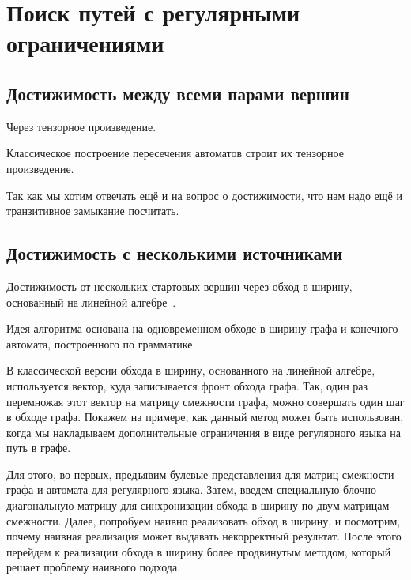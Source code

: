 \setchapterpreamble[u]{\margintoc}
\chapter{Поиск путей с регулярными ограничениями}

\section{Достижимость между всеми парами вершин}

Через тензорное произведение.

Классическое построение пересечения автоматов строит их тензорное произведение.

Так как мы хотим отвечать ещё и на вопрос о достижимости, что нам надо ещё и транзитивное замыкание посчитать.

\section{Достижимость с несколькими источниками}

Достижимость от нескольких стартовых вершин через обход в ширину, основанный на линейной алгебре~.

Идея алгоритма основана на одновременном обходе в ширину графа и конечного автомата, построенного по грамматике.

В классической версии обхода в ширину, основанного на линейной алгебре, используется вектор, куда записывается фронт обхода графа.
Так, один раз перемножая этот вектор на матрицу смежности графа, можно совершать один шаг в обходе графа.
Покажем на примере, как данный метод может быть использован, когда мы накладываем дополнительные ограничения в виде регулярного языка на путь в графе.

Для этого, во-первых, предъявим булевые представления для матриц смежности графа и автомата для регулярного языка.
Затем, введем специальную блочно-диагональную матрицу для синхронизации обхода в ширину по двум матрицам смежности.
Далее, попробуем наивно реализовать обход в ширину, и посмотрим, почему наивная реализация может выдавать некорректный результат.
После этого перейдем к реализации обхода в ширину более продвинутым методом, который решает проблему наивного подхода.

